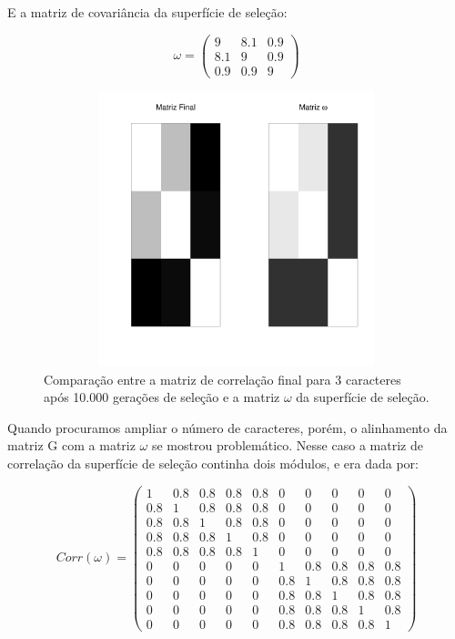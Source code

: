 E a matriz de covariância da superfície de seleção: 

\begin{equation}
\omega = \left( \begin{smallmatrix} 9 & 8.1 & 0.9\\  8.1 & 9 & 0.9 \\ 0.9 & 0.9 & 9 \end{smallmatrix}  \right)
\end{equation}


\begin{figure}[htbp]
  \centering
  \includegraphics[width=150mm, height=80mm]{figuras/Mat3tracos}
   \caption{Comparação entre a matriz de correlação final para 3
   caracteres após 10.000
   gerações de seleção e a matriz $\omega$ da superfície de seleção.}
  \label{MatJones3tracos}
\end{figure}


Quando procuramos ampliar o número de caracteres, porém, o alinhamento da
matriz G com a matriz $\omega$ se mostrou problemático. 
Nesse caso a matriz de correlação da superfície de seleção continha dois
módulos, e era dada por:

\begin{equation}
Corr(\omega) = \left( 
\begin{smallmatrix} 
1 & 0.8 & 0.8 & 0.8 & 0.8 & 0 & 0 & 0 & 0 & 0\\  
0.8 & 1 & 0.8 & 0.8 & 0.8 & 0 & 0 & 0 & 0 & 0\\  
0.8 & 0.8 & 1 & 0.8 & 0.8 & 0 & 0 & 0 & 0 & 0\\  
0.8 & 0.8 & 0.8 & 1 & 0.8 & 0 & 0 & 0 & 0 & 0\\  
0.8 & 0.8 & 0.8 & 0.8 & 1 & 0 & 0 & 0 & 0 & 0\\  
0 & 0 & 0 & 0 & 0 & 1 & 0.8 & 0.8 & 0.8 & 0.8\\ 
0 & 0 & 0 & 0 & 0 & 0.8 & 1 & 0.8 & 0.8 & 0.8\\
0 & 0 & 0 & 0 & 0 & 0.8 & 0.8 & 1 & 0.8 & 0.8\\
0 & 0 & 0 & 0 & 0 & 0.8 & 0.8 & 0.8 & 1 & 0.8\\
0 & 0 & 0 & 0 & 0 & 0.8 & 0.8 & 0.8 & 0.8 & 1
\end{smallmatrix}  \right)
\label{matw}
\end{equation}

